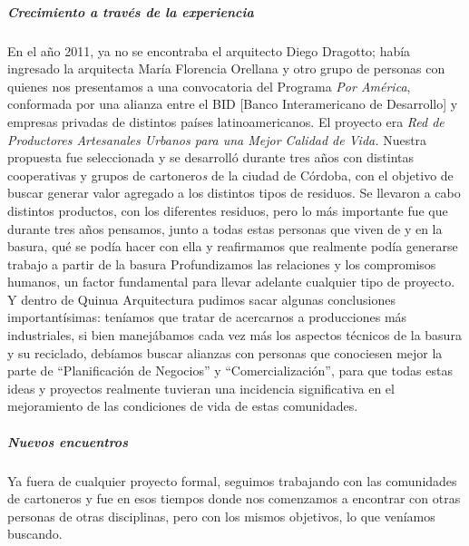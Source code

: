\documentclass[
]{article}
\begin{document}
\hypertarget{crecimiento-a-travuxe9s-de-la-experiencia}{%
\subparagraph{Crecimiento a través de la
experiencia}\label{crecimiento-a-travuxe9s-de-la-experiencia}}

En el año 2011, ya no se encontraba el arquitecto Diego Dragotto; había
ingresado la arquitecta María Florencia Orellana y otro grupo de
personas con quienes nos presentamos a una convocatoria del Programa
\emph{Por América}, conformada por una alianza entre el BID {[}Banco
Interamericano de Desarrollo{]} y empresas privadas de distintos países
latinoamericanos. El proyecto era \emph{Red de Productores Artesanales
Urbanos para una Mejor Calidad de Vida.} Nuestra propuesta fue
seleccionada y se desarrolló durante tres años con distintas
cooperativas y grupos de cartonero\emph{s} de la ciudad de Córdoba, con
el objetivo de buscar generar valor agregado a los distintos tipos de
residuos. Se llevaron a cabo distintos productos, con los diferentes
residuos, pero lo más importante fue que durante tres años pensamos,
junto a todas estas personas que viven de y en la basura, qué se podía
hacer con ella y reafirmamos que realmente podía generarse trabajo a
partir de la basura Profundizamos las relaciones y los compromisos
humanos, un factor fundamental para llevar adelante cualquier tipo de
proyecto. Y dentro de Quinua Arquitectura pudimos sacar algunas
conclusiones importantísimas: teníamos que tratar de acercarnos a
producciones más industriales, si bien manejábamos cada vez más los
aspectos técnicos de la basura y su reciclado, debíamos buscar alianzas
con personas que conociesen mejor la parte de ``Planificación de
Negocios'' y ``Comercialización'', para que todas estas ideas y
proyectos realmente tuvieran una incidencia significativa en el
mejoramiento de las condiciones de vida de estas comunidades.

\hypertarget{nuevos-encuentros}{%
\subparagraph{Nuevos encuentros}\label{nuevos-encuentros}}

Ya fuera de cualquier proyecto formal, seguimos trabajando con las
comunidades de cartoneros y fue en esos tiempos donde nos comenzamos a
encontrar con otras personas de otras disciplinas, pero con los mismos
objetivos, lo que veníamos buscando.
\end{document}
